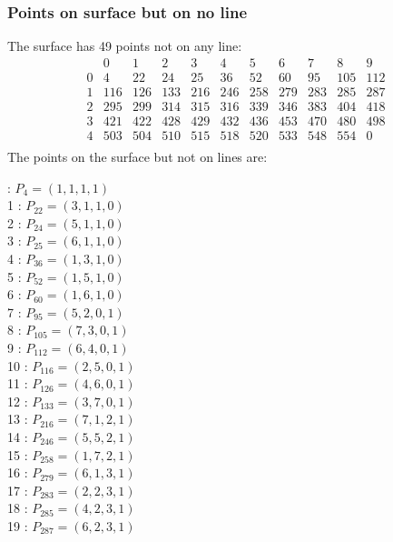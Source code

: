 \documentclass{article}
\begin{document}
{\subsubsection*{Points on surface but on no line}
The surface has 49 points not on any line:\\
$$
\begin{array}{r|*{10}{r}}
 & 0 & 1 & 2 & 3 & 4 & 5 & 6 & 7 & 8 & 9\\
\hline
0 & 4 & 22 & 24 & 25 & 36 & 52 & 60 & 95 & 105 & 112\\
1 & 116 & 126 & 133 & 216 & 246 & 258 & 279 & 283 & 285 & 287\\
2 & 295 & 299 & 314 & 315 & 316 & 339 & 346 & 383 & 404 & 418\\
3 & 421 & 422 & 428 & 429 & 432 & 436 & 453 & 470 & 480 & 498\\
4 & 503 & 504 & 510 & 515 & 518 & 520 & 533 & 548 & 554 & 0\\
\end{array}
$$
The points on the surface but not on lines are:\\
\begin{multicols}{2}
 : $P_{4}=( 1, 1, 1, 1 )$\\
1 : $P_{22}=( 3, 1, 1, 0 )$\\
2 : $P_{24}=( 5, 1, 1, 0 )$\\
3 : $P_{25}=( 6, 1, 1, 0 )$\\
4 : $P_{36}=( 1, 3, 1, 0 )$\\
5 : $P_{52}=( 1, 5, 1, 0 )$\\
6 : $P_{60}=( 1, 6, 1, 0 )$\\
7 : $P_{95}=( 5, 2, 0, 1 )$\\
8 : $P_{105}=( 7, 3, 0, 1 )$\\
9 : $P_{112}=( 6, 4, 0, 1 )$\\
10 : $P_{116}=( 2, 5, 0, 1 )$\\
11 : $P_{126}=( 4, 6, 0, 1 )$\\
12 : $P_{133}=( 3, 7, 0, 1 )$\\
13 : $P_{216}=( 7, 1, 2, 1 )$\\
14 : $P_{246}=( 5, 5, 2, 1 )$\\
15 : $P_{258}=( 1, 7, 2, 1 )$\\
16 : $P_{279}=( 6, 1, 3, 1 )$\\
17 : $P_{283}=( 2, 2, 3, 1 )$\\
18 : $P_{285}=( 4, 2, 3, 1 )$\\
19 : $P_{287}=( 6, 2, 3, 1 )$\\

\end{multicols}}
\end{document}
